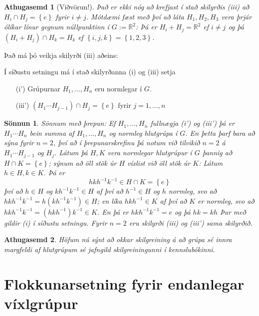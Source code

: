 \documentclass[a4paper,icelandic,11pt]{book}
\theoremstyle{plain}
\newtheorem*{ath}{Athugasemd}
\newtheorem*{sonnun}{Sönnun}
\newcommand{\R}{\mathbb{R}}
\begin{document}
\begin{ath}
  [Viðvörun!]
  Það er ekki nóg að krefjast í stað skilyrðis (iii) að $H_i\cap H_j = \left\{ e
  \right\}$ fyrir $i\neq j$. Mótdæmi fæst með því að láta $H_1,H_2,H_3$ vera 
  þrjár ólíkar línur gegnum núllpunktinn í $G:=\R^2$: Þá er $H_i+H_j = \R^2$
  ef $i\neq j$ og þá $(H_i+H_j)\cap H_k = H_k$ ef $\left\{ i,j,k \right\}
  = \left\{ 1,2,3 \right\}$.
\end{ath}
Það má þó veikja skilyrði (iii) aðeins:
\begin{setn}
  Í síðustu setningu má í stað skilyrðanna (i) og (iii) setja
  \begin{itemize}
    \item [(i')] Grúpurnar $H_1,\dots,H_n$ eru normlegar í $G$.
    \item [(iii')] $(H_1\cdots H_{j-1})\cap H_j = \left\{ e \right\}$
    fyrir $j=1,\dots,n$
  \end{itemize}
\end{setn}
\begin{sonnun}
  Sönnum með þrepun: Ef $H_1,\dots,H_n$ fullnægja (i') og (iii') þá er 
  $H_1\cdots H_n$ bein summa af $H_1,\dots,H_n$ og normleg hlutgrúpa í $G$. En
  þetta þarf bara að sýna fyrir $n=2$, því að í þrepunarskrefinu þá notum við
  tilvikið $n=2$ á $H_1\cdots H_{j-1}$ og $H_j$. Látum þá $H,K$ vera normlegar
  hlutgrúpur í $G$ þannig að $H\cap K = \left\{ e \right\}$; sýnum að öll stök
  úr $H$ víxlist við öll stök úr $K$: Látum $h\in H, k\in K$. Þá er
  \[
    hkh^{-1}k^{-1} \in H\cap K = \left\{ e \right\}
  \]
  því að $h\in H$ og $kh^{-1}k^{-1}\in H$ af því að $h^{-1}\in H$ og $h$ normleg,
  svo að $hkh^{-1}k^{-1} = h(kh^{-1}k^{-1})\in H$; en líka $hkh^{-1}\in K$ af
  því að $K$ er normleg, svo að $hkh^{-1}k^{-1} = (hkh^{-1})k^{-1}\in K$. En
  þá er $hkh^{-1}k^{-1} = e$ og þá $hk = kh$ Þar með gildir (i) í síðustu
  setningu. Fyrir $n = 2$ eru skilyrði (iii) og (iii') sama skilyrðið.
\end{sonnun}
\begin{ath}
  Höfum nú sýnt að okkar skilgreining á að grúpa sé innra margfeldi af 
  hlutgrúpum sé jafngild skilgreiningunni í kennslubókinni.
\end{ath}


\chapter{Flokkunarsetning fyrir endanlegar víxlgrúpur}
\end{document}
